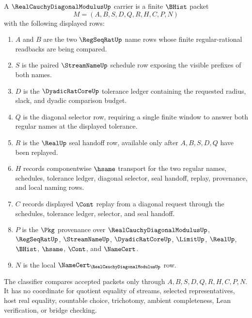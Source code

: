 \begin{definition}
\label{def:real-cauchy-diagonal-modulus-carrier}
A $\RealCauchyDiagonalModulusUp$ carrier is a finite $\BHist$ packet
$$
M=(A,B,S,D,Q,R,H,C,P,N)
$$
with the following displayed rows:
\begin{enumerate}
\item $A$ and $B$ are the two $\RegSeqRatUp$ name rows whose finite regular-rational readbacks are being compared.
\item $S$ is the paired $\StreamNameUp$ schedule row exposing the visible prefixes of both names.
\item $D$ is the $\DyadicRatCoreUp$ tolerance ledger containing the requested radius, slack, and dyadic comparison budget.
\item $Q$ is the diagonal selector row, requiring a single finite window to answer both regular names at the displayed tolerance.
\item $R$ is the $\RealUp$ seal handoff row, available only after $A,B,S,D,Q$ have been replayed.
\item $H$ records componentwise $\hsame$ transport for the two regular names, schedules, tolerance ledger, diagonal selector, seal handoff, replay, provenance, and local naming rows.
\item $C$ records displayed $\Cont$ replay from a diagonal request through the schedules, tolerance ledger, selector, and seal handoff.
\item $P$ is the $\Pkg$ provenance over $\RealCauchyDiagonalModulusUp$, $\RegSeqRatUp$, $\StreamNameUp$, $\DyadicRatCoreUp$, $\LimitUp$, $\RealUp$, $\BHist$, $\hsame$, $\Cont$, and $\NameCert$.
\item $N$ is the local $\NameCert_{\RealCauchyDiagonalModulusUp}$ row.
\end{enumerate}
The classifier compares accepted packets only through $A,B,S,D,Q,R,H,C,P,N$. It has no coordinate for quotient equality of streams, selected representatives, host real equality, countable choice, trichotomy, ambient completeness, Lean verification, or bridge checking.
\end{definition}

